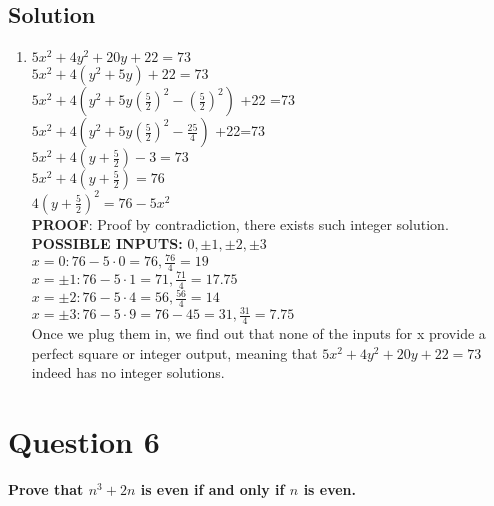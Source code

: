 \documentclass[11pt]{article}
\begin{document}
    \subsection*{Solution}
    \begin{enumerate}[label=(\alph*)]
        \item[] \(5x^2 +4y^2+20y+22=73\) \\
        \(5x^2 +4(y^2+5y)+22=73\) \\
        \(5x^2+4(y^2+5y(\frac{5}{2})^2-(\frac{5}{2})^2)\) +22 =73 \\
        \(5x^2+4(y^2+5y(\frac{5}{2})^2-\frac{25}{4})\) +22=73 \\
        \(5x^2+4(y+\frac{5}{2})-3=73\) \\
        \(5x^2+4(y+\frac{5}{2})=76\) \\
        \(4(y+\frac{5}{2})^2=76-5x^2\) \\
        \textbf{PROOF}: Proof by contradiction, there exists such integer solution. \\
        \textbf{POSSIBLE INPUTS:} \(0,\pm 1,\pm 2,\pm 3\) \\
        \(x = 0: 76 - 5 \cdot 0 = 76, \frac{76}{4} = 19\) \\
        \(x = \pm 1: 76 - 5 \cdot 1 = 71, \frac{71}{4} = 17.75\) \\
        \(x = \pm 2: 76 - 5 \cdot 4 = 56, \frac{56}{4} = 14\) \\
        \(x = \pm 3: 76 - 5 \cdot 9 = 76 - 45 = 31, \frac{31}{4} = 7.75\) \\
        Once we plug them in, we find out that none of the inputs for x provide a perfect square or integer output, meaning that \(5x^2 +4y^2+20y+22=73\) indeed has no integer solutions. \\
        
        
    \end{enumerate}


\clearpage
\section*{Question 6}
    \textbf{Prove that \(n^3 +2n\) is even if and only if \(n\) is even.}
\end{document}
